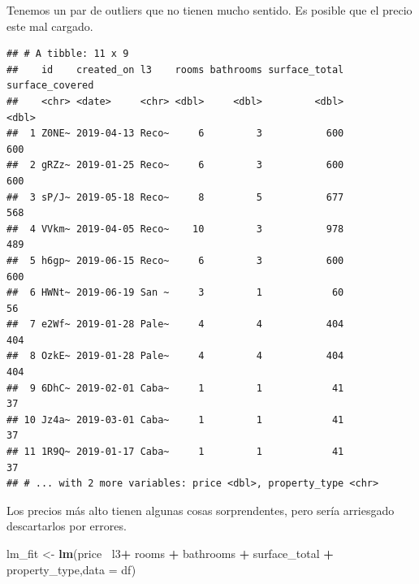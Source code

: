 \documentclass[]{book}
\newenvironment{Shaded}{\begin{snugshade}}{\end{snugshade}}
\newcommand{\DataTypeTok}[1]{\textcolor[rgb]{0.13,0.29,0.53}{#1}}
\newcommand{\DecValTok}[1]{\textcolor[rgb]{0.00,0.00,0.81}{#1}}
\newcommand{\KeywordTok}[1]{\textcolor[rgb]{0.13,0.29,0.53}{\textbf{#1}}}
\newcommand{\NormalTok}[1]{#1}
\newcommand{\OperatorTok}[1]{\textcolor[rgb]{0.81,0.36,0.00}{\textbf{#1}}}
\newcommand{\StringTok}[1]{\textcolor[rgb]{0.31,0.60,0.02}{#1}}
\begin{document}
\begin{Shaded}
\end{Shaded}

Tenemos un par de outliers que no tienen mucho sentido. Es posible que el precio este mal cargado.

\begin{Shaded}
\end{Shaded}

\begin{verbatim}
## # A tibble: 11 x 9
##    id    created_on l3    rooms bathrooms surface_total surface_covered
##    <chr> <date>     <chr> <dbl>     <dbl>         <dbl>           <dbl>
##  1 Z0NE~ 2019-04-13 Reco~     6         3           600             600
##  2 gRZz~ 2019-01-25 Reco~     6         3           600             600
##  3 sP/J~ 2019-05-18 Reco~     8         5           677             568
##  4 VVkm~ 2019-04-05 Reco~    10         3           978             489
##  5 h6gp~ 2019-06-15 Reco~     6         3           600             600
##  6 HWNt~ 2019-06-19 San ~     3         1            60              56
##  7 e2Wf~ 2019-01-28 Pale~     4         4           404             404
##  8 OzkE~ 2019-01-28 Pale~     4         4           404             404
##  9 6DhC~ 2019-02-01 Caba~     1         1            41              37
## 10 Jz4a~ 2019-03-01 Caba~     1         1            41              37
## 11 1R9Q~ 2019-01-17 Caba~     1         1            41              37
## # ... with 2 more variables: price <dbl>, property_type <chr>
\end{verbatim}

Los precios más alto tienen algunas cosas sorprendentes, pero sería arriesgado descartarlos por errores.

\begin{Shaded}
\begin{Highlighting}[]
\NormalTok{lm_fit <-}\StringTok{ }\KeywordTok{lm}\NormalTok{(price}\OperatorTok{~}\StringTok{ }\NormalTok{l3}\OperatorTok{+}\StringTok{ }\NormalTok{rooms }\OperatorTok{+}\StringTok{ }\NormalTok{bathrooms }\OperatorTok{+}\StringTok{ }\NormalTok{surface_total }\OperatorTok{+}\StringTok{ }\NormalTok{property_type,}\DataTypeTok{data =}\NormalTok{ df)}
\end{Highlighting}
\end{Shaded}
\end{document}
